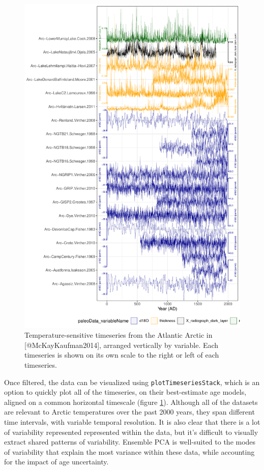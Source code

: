 \documentclass[gchron, manuscript]{copernicus}
\begin{document}
\begin{figure}
\includegraphics[width=12cm]{geoChronR-paper_files/figure-latex/timeseries-stack-1} \caption{Temperature-sensitive timeseries from the Atlantic Arctic in [@McKayKaufman2014], arranged vertically by variable. Each timeseries is shown on its own scale to the right or left of each timeseries.}\label{fig:timeseries-stack}
\end{figure}

Once filtered, the data can be visualized using \texttt{plotTimeseriesStack}, which is an option to quickly plot all of the timeseries, on their best-estimate age models, aligned on a common horizontal timescale (figure \ref{fig:timeseries-stack}).
Although all of the datasets are relevant to Arctic temperatures over the past 2000 years, they span different time intervals, with variable temporal resolution.
It is also clear that there is a lot of variability represented represented within the data, but it's difficult to visually extract shared patterns of variability.
Ensemble PCA is well-suited to the modes of variability that explain the most variance within these data, while accounting for the impact of age uncertainty.
\end{document}
